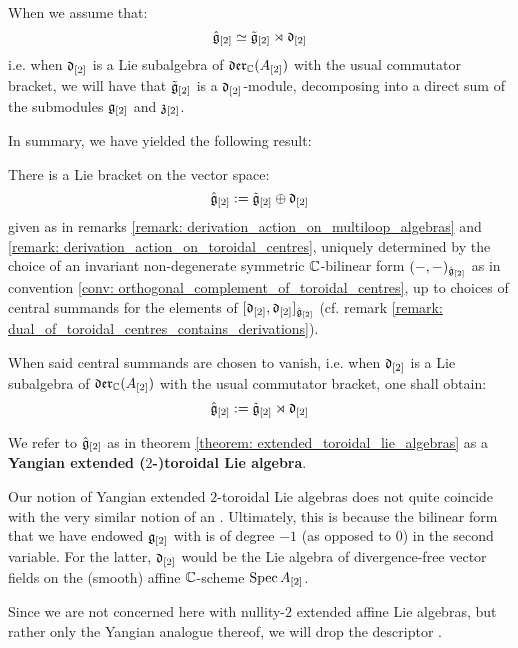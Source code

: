         \begin{proposition} \label{prop: toroidal_lie_algebras_as_modules_over_div_0_vector_field_lie_algebras}
            When we assume that:
                $$\hat{\mathfrak{g}}_{[2]} \simeq \tilde{\mathfrak{g}}_{[2]} \rtimes \mathfrak{d}_{[2]}$$
            i.e. when $\mathfrak{d}_{[2]}$ is a Lie subalgebra of $\mathfrak{der}_{\mathbb{C}}(A_{[2]})$ with the usual commutator bracket, we will have that $\tilde{\mathfrak{g}}_{[2]}$ is a $\mathfrak{d}_{[2]}$-module, decomposing into a direct sum of the submodules $\mathfrak{g}_{[2]}$ and $\mathfrak{z}_{[2]}$. 
        \end{proposition}
        
        In summary, we have yielded the following result:
        \begin{theorem} \label{theorem: extended_toroidal_lie_algebras}
            There is a Lie bracket on the vector space:
                $$\hat{\mathfrak{g}}_{[2]} := \tilde{\mathfrak{g}}_{[2]} \oplus \mathfrak{d}_{[2]}$$
            given as in remarks \ref{remark: derivation_action_on_multiloop_algebras} and \ref{remark: derivation_action_on_toroidal_centres}, uniquely determined by the choice of an invariant non-degenerate symmetric $\mathbb{C}$-bilinear form $(-, -)_{\hat{\mathfrak{g}}_{[2]}}$ as in convention \ref{conv: orthogonal_complement_of_toroidal_centres}, up to choices of central summands for the elements of $[\mathfrak{d}_{[2]}, \mathfrak{d}_{[2]}]_{\hat{\mathfrak{g}}_{[2]}}$ (cf. remark \ref{remark: dual_of_toroidal_centres_contains_derivations}).

            When said central summands are chosen to vanish, i.e. when $\mathfrak{d}_{[2]}$ is a Lie subalgebra of $\mathfrak{der}_{\mathbb{C}}(A_{[2]})$ with the usual commutator bracket, one shall obtain:
                $$\hat{\mathfrak{g}}_{[2]} := \tilde{\mathfrak{g}}_{[2]} \rtimes \mathfrak{d}_{[2]}$$
        \end{theorem}
        \begin{definition} \label{def: extended_toroidal_lie_algebras}
            We refer to $\hat{\mathfrak{g}}_{[2]}$ as in theorem \ref{theorem: extended_toroidal_lie_algebras} as a \textbf{Yangian extended ($2$-)toroidal Lie algebra}. 
        \end{definition}
        \begin{remark}
            Our notion of Yangian extended $2$-toroidal Lie algebras does not quite coincide with the very similar notion of an . Ultimately, this is because the bilinear form that we have endowed $\mathfrak{g}_{[2]}$ with is of degree $-1$ (as opposed to $0$) in the second variable. For the latter, $\mathfrak{d}_{[2]}$ would be the Lie algebra of divergence-free vector fields on the (smooth) affine $\mathbb{C}$-scheme $\operatorname{Spec} A_{[2]}$.
        \end{remark}
        \begin{convention}
            Since we are not concerned here with nullity-$2$ extended affine Lie algebras, but rather only the Yangian analogue thereof, we will drop the descriptor . 
        \end{convention}

